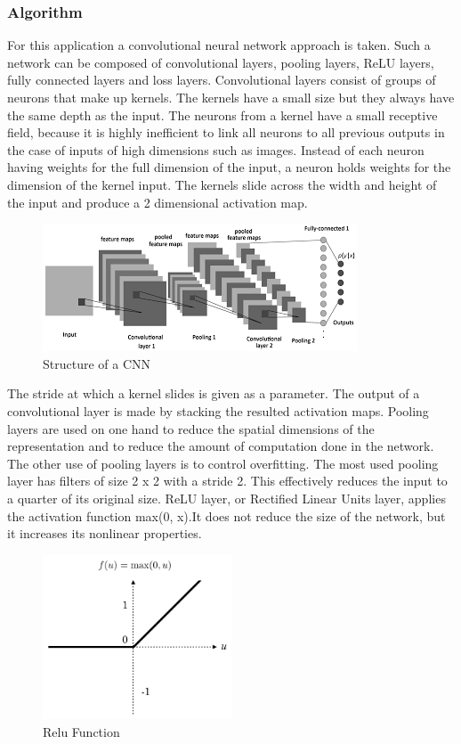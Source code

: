 \documentclass[a4paper,11pt]{article}
\begin{document}
  \subsubsection{Algorithm}
	For this application a convolutional neural network approach is taken. Such a network
	can be composed of convolutional layers, pooling layers, ReLU layers, fully
	connected layers and loss layers. Convolutional layers consist of groups of neurons that make up kernels.
	The kernels have a small size but they always have the same depth as the
	input. The neurons from a kernel have a small receptive field, because it is
	highly inefficient to link all neurons to all previous outputs in the case of
	inputs of high dimensions such as images. Instead of each neuron having
	weights for the full dimension of the input, a neuron holds weights for the
	dimension of the kernel input. The kernels slide across the width and height
	of the input and produce a 2 dimensional activation map. 
	\begin{figure}[H]
		\includegraphics[width = \textwidth]{convo.png}
		\caption{Structure of a CNN}
	\end{figure}


	The stride at which a kernel slides is given as a parameter. The output of a convolutional
	layer is made by stacking the resulted activation maps.
	Pooling layers are used on one hand to reduce the spatial dimensions of
	the representation and to reduce the amount of computation done in the
	network. The other use of pooling layers is to control overfitting. The most
	used pooling layer has filters of size 2 x 2 with a stride 2. This effectively
	reduces the input to a quarter of its original size. ReLU layer, or Rectified
	Linear Units layer, applies the activation function max(0, x).It does not
	reduce the size of the network, but it increases its nonlinear properties.
	\begin{figure}[H]
		\includegraphics[width = 0.5\textwidth]{relu.png}
		\caption{Relu Function}
	\end{figure}
\end{document}
